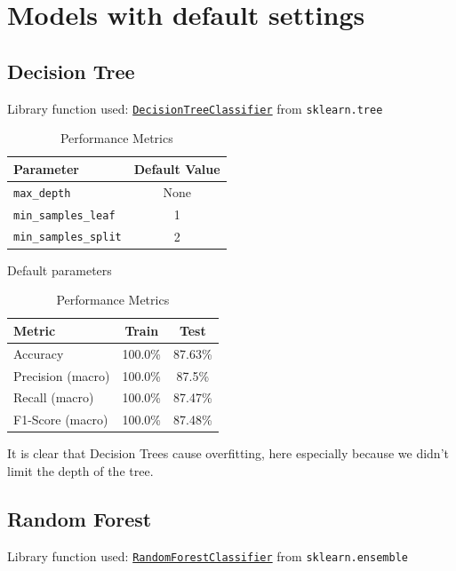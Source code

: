 \newpage
\section{Models with default settings}

\subsection{Decision Tree}
Library function used: \texttt{\href{https://scikit-learn.org/stable/modules/generated/sklearn.tree.DecisionTreeClassifier.html}{DecisionTreeClassifier}} from \texttt{sklearn.tree}
\begin{table}[h!]
  \begin{minipage}{.5\linewidth}
    \centering
    \begin{tabular}{|l|c|}
      \hline
      \textbf{Parameter} & \textbf{Default Value} \\
      \hline
      \texttt{max\_depth} & None \\
      \texttt{min\_samples\_leaf} & 1 \\
      \texttt{min\_samples\_split} & 2 \\
      \hline
    \end{tabular}
    \caption{Default parameters}
  \end{minipage}%
  \begin{minipage}{.5\linewidth}
    \centering
    \begin{tabular}{|l|c|c|}
      \hline
      \textbf{Metric} & \textbf{Train} & \textbf{Test} \\
      \hline
      Accuracy & 100.0\% & 87.63\% \\
      Precision (macro) & 100.0\% & 87.5\% \\
      Recall (macro) & 100.0\% & 87.47\% \\
      F1-Score (macro) & 100.0\% & 87.48\% \\
      \hline
    \end{tabular}
    \caption{Performance Metrics}
  \end{minipage}
\end{table}


It is clear that Decision Trees cause overfitting, here especially because we didn't limit the depth of the tree.
\subsection{Random Forest}
Library function used: \texttt{\href{https://scikit-learn.org/stable/modules/generated/sklearn.ensemble.RandomForestClassifier.html}{RandomForestClassifier}} from \texttt{sklearn.ensemble}


